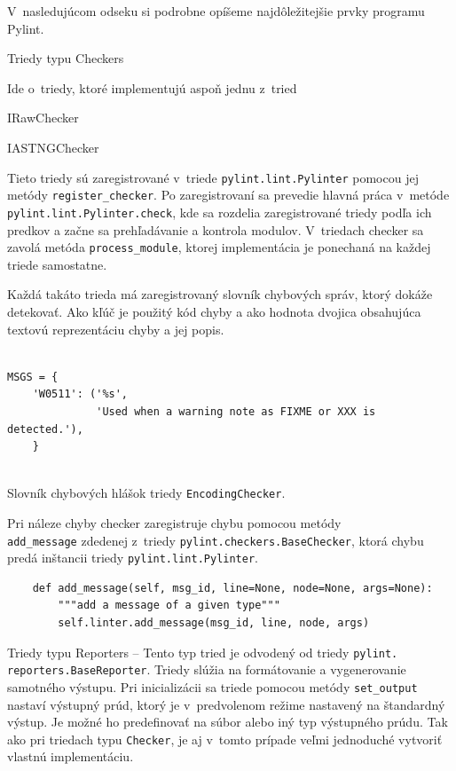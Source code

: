\documentclass[11pt,oneside,final]{fithesis2}
\begin{document}
		V~nasledujúcom odseku si podrobne opíšeme najdôležitejšie prvky programu Pylint.
		
    \begin{list}{•}{}
		\item Triedy typu Checkers 
		
		Ide o~triedy, ktoré implementujú aspoň jednu z~tried
		
			    \begin{list}{•}{}
					\item IRawChecker
					\item IASTNGChecker
    			\end{list}		
		
		Tieto triedy sú zaregistrované v~triede \texttt{pylint.lint.Pylinter} pomocou jej metódy \texttt{register\_checker}.	Po zaregistrovaní sa prevedie hlavná práca v~metóde \texttt{pylint.lint.Pylinter.check}, kde sa rozdelia zaregistrované triedy podľa ich predkov a začne sa prehľadávanie a kontrola modulov. V~triedach checker sa zavolá metóda \texttt{process\_module}, ktorej implementácia je ponechaná na každej triede samostatne.
		
		Každá takáto trieda má zaregistrovaný slovník chybových správ, ktorý dokáže detekovať. Ako kľúč je použitý kód chyby a ako hodnota dvojica obsahujúca textovú reprezentáciu chyby a jej popis.

\begin{lstlisting}

MSGS = {
    'W0511': ('%s',
              'Used when a warning note as FIXME or XXX is detected.'),
    }
		
\end{lstlisting}		

Slovník chybových hlášok triedy \texttt{EncodingChecker}.


Pri náleze chyby checker zaregistruje chybu pomocou metódy \\\texttt{add\_message} zdedenej z~triedy \texttt{pylint.checkers.BaseChecker}, ktorá chybu predá inštancii triedy \texttt{pylint.lint.Pylinter}.

\begin{lstlisting}
    def add_message(self, msg_id, line=None, node=None, args=None):
        """add a message of a given type"""
        self.linter.add_message(msg_id, line, node, args)
\end{lstlisting}

	
		\item Triedy typu Reporters -- 
		Tento typ tried je odvodený od triedy \texttt{pylint.\\reporters.BaseReporter}. Triedy slúžia na formátovanie a vygenerovanie samotného výstupu. Pri inicializácii sa triede pomocou metódy \texttt{set\_output} nastaví výstupný prúd, ktorý je v~predvolenom režime nastavený na štandardný výstup. Je možné ho predefinovať na súbor alebo iný typ výstupného prúdu. Tak ako pri triedach typu \texttt{Checker}, je aj v~tomto prípade veľmi jednoduché vytvoriť vlastnú implementáciu.
		

\end{list}
\end{document}
